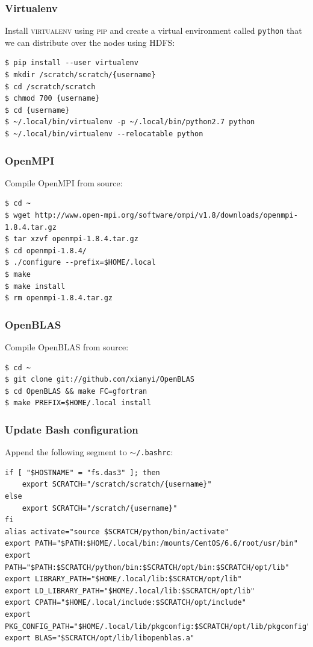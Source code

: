 \documentclass{article}
\begin{document}
\subsubsection{Virtualenv}\label{app:virtualenv}

Install \textsc{virtualenv} using \textsc{pip} and create a virtual environment 
called \texttt{python} that we can distribute over the nodes using HDFS:

\begin{verbatim}
$ pip install --user virtualenv
$ mkdir /scratch/scratch/{username}
$ cd /scratch/scratch
$ chmod 700 {username}
$ cd {username}
$ ~/.local/bin/virtualenv -p ~/.local/bin/python2.7 python
$ ~/.local/bin/virtualenv --relocatable python
\end{verbatim}

\subsubsection{OpenMPI}\label{app:openmpi}
Compile OpenMPI from source:

\begin{verbatim}
$ cd ~
$ wget http://www.open-mpi.org/software/ompi/v1.8/downloads/openmpi-1.8.4.tar.gz
$ tar xzvf openmpi-1.8.4.tar.gz
$ cd openmpi-1.8.4/
$ ./configure --prefix=$HOME/.local
$ make
$ make install
$ rm openmpi-1.8.4.tar.gz
\end{verbatim}

\subsubsection{OpenBLAS}\label{app:openblas}
Compile OpenBLAS from source:

\begin{verbatim}
$ cd ~
$ git clone git://github.com/xianyi/OpenBLAS
$ cd OpenBLAS && make FC=gfortran
$ make PREFIX=$HOME/.local install
\end{verbatim}

\subsubsection{Update Bash configuration}\label{app:update-bashrc}
Append the following segment to \texttt{$\sim$/.bashrc}:

\begin{verbatim}
if [ "$HOSTNAME" = "fs.das3" ]; then
    export SCRATCH="/scratch/scratch/{username}"
else
    export SCRATCH="/scratch/{username}"
fi
alias activate="source $SCRATCH/python/bin/activate"
export PATH="$PATH:$HOME/.local/bin:/mounts/CentOS/6.6/root/usr/bin"
export PATH="$PATH:$SCRATCH/python/bin:$SCRATCH/opt/bin:$SCRATCH/opt/lib"
export LIBRARY_PATH="$HOME/.local/lib:$SCRATCH/opt/lib"
export LD_LIBRARY_PATH="$HOME/.local/lib:$SCRATCH/opt/lib"
export CPATH="$HOME/.local/include:$SCRATCH/opt/include"
export PKG_CONFIG_PATH="$HOME/.local/lib/pkgconfig:$SCRATCH/opt/lib/pkgconfig"
export BLAS="$SCRATCH/opt/lib/libopenblas.a"
\end{verbatim}
\end{document}
